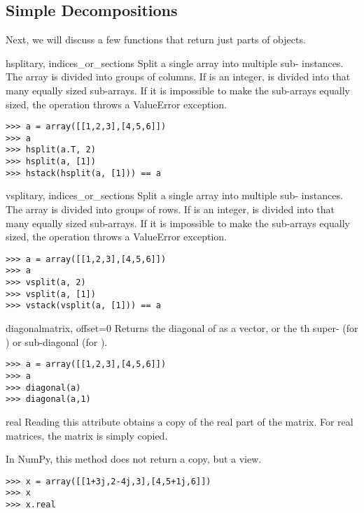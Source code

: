 \subsection{Simple  Decompositions}
Next, we will discuss a few functions that return just parts of 
objects.

\begin{funcdesc}{hsplit}{ary, indices_or_sections}
  Split a single  array into multiple sub-
  instances.  The array is divided into groups of columns.  If
   is an integer,  is divided into that
  many equally sized sub-arrays.  If it is impossible to make the sub-arrays
  equally sized, the operation throws a ValueError exception. 
  
\begin{verbatim}
>>> a = array([[1,2,3],[4,5,6]])
>>> a
>>> hsplit(a.T, 2)
>>> hsplit(a, [1])
>>> hstack(hsplit(a, [1])) == a
\end{verbatim}
\end{funcdesc}

\begin{funcdesc}{vsplit}{ary, indices_or_sections}
  Split a single  array into multiple sub-
  instances.  The array is divided into groups of rows.  If
   is an integer,  is divided into that
  many equally sized sub-arrays.  If it is impossible to make the sub-arrays
  equally sized, the operation throws a ValueError exception. 
  
\begin{verbatim}
>>> a = array([[1,2,3],[4,5,6]])
>>> a
>>> vsplit(a, 2)
>>> vsplit(a, [1])
>>> vstack(vsplit(a, [1])) == a
\end{verbatim}
\end{funcdesc}

\begin{funcdesc}{diagonal}{matrix, offset=0}
  Returns the diagonal of  as a vector, or the th
  super- (for ) or sub-diagonal (for ).
\begin{verbatim}
>>> a = array([[1,2,3],[4,5,6]])
>>> a
>>> diagonal(a)
>>> diagonal(a,1)
\end{verbatim}
\end{funcdesc}

\begin{memberdesc}[Array]{real}
  Reading this attribute obtains a copy of the real part of the matrix.
  For real matrices, the matrix is simply copied.

  In NumPy, this method does not return a copy, but a view.
\begin{verbatim}
>>> x = array([[1+3j,2-4j,3],[4,5+1j,6]])
>>> x
>>> x.real
\end{verbatim}
\end{memberdesc}

